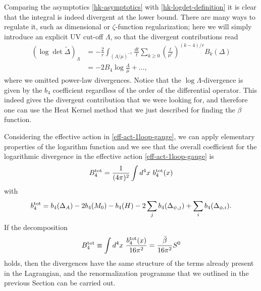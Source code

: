Comparing the asymptotics \eqref{hk-asymptotics}  with \eqref{hk-logdet-definition} it is clear that the integral is indeed divergent at the lower bound. There are many ways to regulate it, such as dimensional or $\zeta$-function regularization; here we will simply introduce an explicit UV cut-off $\Lambda$, so that the divergent contributions read
\begin{equation}
\begin{split}
\left( \log \det \tilde \Delta \right)_\Lambda 
	& = 
-
\frac{2}{r}
\int_{ (\Lambda/\mu)^{-r} } \frac{dt}{t} \sum_{ k \geq 0 } \left( \frac{t}{\mu^r} \right)^{ (k - 4)/r  } B_k(\Delta) \\
	& =
	- 2 B_4 \log \frac{\Lambda}{\mu}
	+ \ldots,
\end{split}
\end{equation}
where we omitted power-law divergences. Notice that the $\log\Lambda$-divergence is given by the $b_4$ coefficient regardless of the order of the differential operator. This indeed gives the divergent contribution that we were looking for, and  therefore one can use the Heat Kernel method that we just described for finding the $\beta$ function. 




Considering the effective action in \eqref{eff-act-1loop-gauge}, we can apply elementary properties of the logarithm function and we see that the overall coefficient for the logarithmic divergence in the effective action \eqref{eff-act-1loop-gauge} is
\begin{equation}
B^{ \text{tot} }_4 = \frac{1}{(4\pi)^2}\int d^4 x\  b_4^{{ \text{tot} }}(x)
\end{equation}
with
\begin{equation}\label{b4-total}
\begin{split}
b_4^{ \text{tot} } = 
	b_4( \Delta_{A})
	- 2 b_4( M_0)
	-	b_4( H) 
	- 2 \sum_j	b_4( \Delta_{\psi,j}) 
	+ \sum_i 	b_4( \Delta_{\phi,i})
.
\end{split}
\end{equation}
If the decomposition
\begin{equation}\label{ren-1loop-contribution}
B^{ \text{tot} }_4 \equiv \int d^4 x \  \frac{b^{ \text{tot} }_4(x) }{ 16 \pi^2 } = \frac{ \bar \beta }{ 16 \pi^2 }   S^0
\end{equation}
holds, then the divergences have the same structure of the terms already present in the Lagrangian, and the renormalization programme that we outlined in the previous Section can be carried out.


